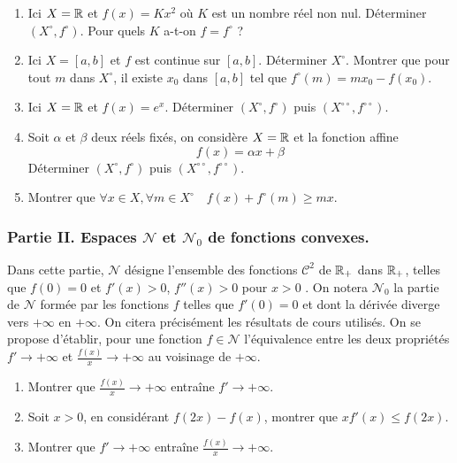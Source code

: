 \begin{enumerate}
\item Ici $X=\mathbb{R}$ et $f(x)=Kx^{2}$ où $K$ est un nombre réel non nul.
D\'{e}terminer $(X^{\circ},f^{\circ})$. Pour quels $K$ a-t-on $f=f^{\circ}$ ?

\item  Ici $X=\left[ a,b\right] $ et $f$ est continue sur $\left[ a,b\right] $. D\'{e}terminer $X^{\circ }$. Montrer que pour tout $m$ dans $X^{\circ }$, il existe $x_{0}$ dans $\left[ a,b\right] $ tel que $f^{\circ }(m)=mx_{0}-f(x_{0})$.

\item  Ici $X=\mathbb{R}$ et $f(x)=e^{x}$. D\'{e}terminer $(X^{\circ },f^{\circ })$ puis $(X^{\circ \circ },f^{\circ \circ })$.

\item  Soit $\alpha $ et $\beta $ deux r\'{e}els fix\'{e}s, on consid\`{e}re
$X=\mathbb{R}$ et la fonction affine
\[
f(x)=\alpha x+\beta
\]
D\'{e}terminer $(X^{\circ },f^{\circ })$ puis $(X^{\circ \circ },f^{\circ
\circ })$.

\item  Montrer que $\forall x\in X,\forall m\in X^{\circ }\quad
f(x)+f^{\circ }(m)\geq mx$.

\end{enumerate}


\subsubsection*{Partie II. Espaces $\mathcal{N}$ et $\mathcal{N}_0$ de fonctions convexes.}
Dans cette partie, $\mathcal{N}$ désigne l'ensemble des fonctions $\mathcal{C}^2$ de $\mathbb{R}_+$ dans $\mathbb{R}_+$,  telles que $f(0)=0$ et $f'(x)>0$, $f''(x)>0$ pour $x>0$ .\newline
On notera $\mathcal{N}_0$ la partie de $\mathcal{N}$ formée par les fonctions $f$ telles que $f'(0)=0$ et dont la dérivée diverge vers $+\infty$ en $+\infty$.\newline
On citera précisément les résultats de cours utilisés.
On se propose d'établir, pour une fonction $f\in \mathcal{N}$ l'équivalence entre les deux propriétés $f'\rightarrow +\infty$ et $\frac{f(x)}{x}\rightarrow +\infty$ au voisinage de $+\infty$.
\begin{enumerate}
\item Montrer que $\frac{f(x)}{x}\rightarrow +\infty$ entraîne $f'\rightarrow +\infty$.
\item Soit $x>0$, en considérant $f(2x)-f(x)$, montrer que $xf'(x)\leq f(2x)$.
\item Montrer que $f'\rightarrow +\infty$ entraîne $\frac{f(x)}{x}\rightarrow +\infty$.
\end{enumerate}

